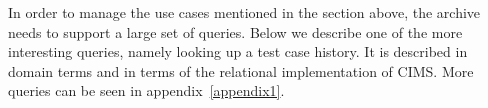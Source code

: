 
In order to manage the use cases mentioned in the section above, the archive needs to support a large set of queries. Below we describe one of the more interesting queries, namely looking up a test case history. It is described in domain terms and in terms of the relational implementation of CIMS. More queries can be seen in appendix~\ref{appendix1}.


